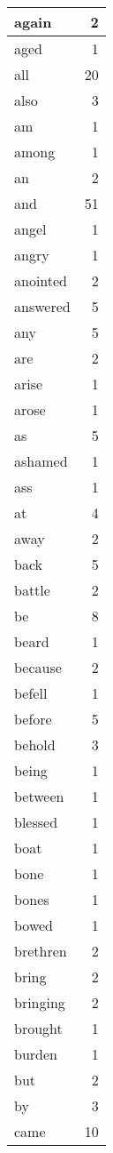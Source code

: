 \begin{center}
\begin{longtable}{l|r}
again & 2 \\ \hline
aged & 1 \\ \hline
all & 20 \\ \hline
also & 3 \\ \hline
am & 1 \\ \hline
among & 1 \\ \hline
an & 2 \\ \hline
and & 51 \\ \hline
angel & 1 \\ \hline
angry & 1 \\ \hline
anointed & 2 \\ \hline
answered & 5 \\ \hline
any & 5 \\ \hline
are & 2 \\ \hline
arise & 1 \\ \hline
arose & 1 \\ \hline
as & 5 \\ \hline
ashamed & 1 \\ \hline
ass & 1 \\ \hline
at & 4 \\ \hline
away & 2 \\ \hline
back & 5 \\ \hline
battle & 2 \\ \hline
be & 8 \\ \hline
beard & 1 \\ \hline
because & 2 \\ \hline
befell & 1 \\ \hline
before & 5 \\ \hline
behold & 3 \\ \hline
being & 1 \\ \hline
between & 1 \\ \hline
blessed & 1 \\ \hline
boat & 1 \\ \hline
bone & 1 \\ \hline
bones & 1 \\ \hline
bowed & 1 \\ \hline
brethren & 2 \\ \hline
bring & 2 \\ \hline
bringing & 2 \\ \hline
brought & 1 \\ \hline
burden & 1 \\ \hline
but & 2 \\ \hline
by & 3 \\ \hline
came & 10 \\ \hline

\end{longtable}
\end{center}
